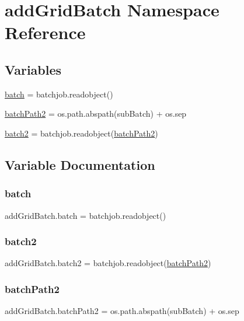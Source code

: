 \hypertarget{namespaceaddGridBatch}{}\section{add\+Grid\+Batch Namespace Reference}
\label{namespaceaddGridBatch}
\subsection*{Variables}
\begin{DoxyCompactItemize}
\item 
\mbox{\hyperlink{namespaceaddGridBatch_a924a50343f35515827b871f6a1b000cb}{batch}} = batchjob.\+readobject()
\item 
\mbox{\hyperlink{namespaceaddGridBatch_af777c2d01fec417caf532aa1dd2a1855}{batch\+Path2}} = os.\+path.\+abspath(sub\+Batch) + os.\+sep
\item 
\mbox{\hyperlink{namespaceaddGridBatch_a9530ef5e1cdfd4116357c6630329675d}{batch2}} = batchjob.\+readobject(\mbox{\hyperlink{namespaceaddGridBatch_af777c2d01fec417caf532aa1dd2a1855}{batch\+Path2}})
\end{DoxyCompactItemize}


\subsection{Variable Documentation}
\mbox{\label{namespaceaddGridBatch_a924a50343f35515827b871f6a1b000cb}} 
\subsubsection{\texorpdfstring{batch}{batch}}
{\footnotesize\ttfamily add\+Grid\+Batch.\+batch = batchjob.\+readobject()}

\mbox{\label{namespaceaddGridBatch_a9530ef5e1cdfd4116357c6630329675d}} 
\subsubsection{\texorpdfstring{batch2}{batch2}}
{\footnotesize\ttfamily add\+Grid\+Batch.\+batch2 = batchjob.\+readobject(\mbox{\hyperlink{namespaceaddGridBatch_af777c2d01fec417caf532aa1dd2a1855}{batch\+Path2}})}

\mbox{\label{namespaceaddGridBatch_af777c2d01fec417caf532aa1dd2a1855}} 
\subsubsection{\texorpdfstring{batch\+Path2}{batchPath2}}
{\footnotesize\ttfamily add\+Grid\+Batch.\+batch\+Path2 = os.\+path.\+abspath(sub\+Batch) + os.\+sep}

